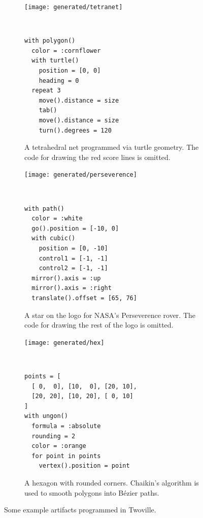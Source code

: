 \begin{figure}
\begin{subfigure}{0.3\linewidth}
\begin{minipage}{\linewidth}
\texttt{[image: generated/tetranet]}
\end{minipage}
\\
\begin{minipage}{\linewidth}
\small
\begin{verbatim}
with polygon()
  color = :cornflower
  with turtle()
    position = [0, 0]
    heading = 0
  repeat 3
    move().distance = size
    tab()
    move().distance = size
    turn().degrees = 120
\end{verbatim}
\end{minipage}
\caption{A tetrahedral net programmed via turtle geometry. The code for drawing the red score lines is omitted.}
\label{figure:tetranet}
\end{subfigure}%
\hfill
\begin{subfigure}{0.3\linewidth}
\begin{minipage}{\linewidth}
\texttt{[image: generated/perseverence]}
\vspace{0.5em}
\end{minipage}
\\
\begin{minipage}{\linewidth}
\small
\begin{verbatim}
with path()
  color = :white
  go().position = [-10, 0]
  with cubic()
    position = [0, -10]
    control1 = [-1, -1]
    control2 = [-1, -1]
  mirror().axis = :up
  mirror().axis = :right
  translate().offset = [65, 76]
\end{verbatim}
\end{minipage}
\caption{A star on the logo for NASA's Perseverence rover. The code for drawing the rest of the logo is omitted.}
\label{figure:perseverence}
\end{subfigure}%
\hfill
\begin{subfigure}{0.3\linewidth}
\begin{minipage}{\linewidth}
\texttt{[image: generated/hex]}
\vspace{0.5em}
\end{minipage}
\\
\begin{minipage}{\linewidth}
\small
\begin{verbatim}
points = [
  [ 0,  0], [10,  0], [20, 10],
  [20, 20], [10, 20], [ 0, 10]
]
with ungon()
  formula = :absolute
  rounding = 2
  color = :orange
  for point in points
    vertex().position = point
\end{verbatim}
\end{minipage}
\caption{A hexagon with rounded corners. Chaikin's algorithm is used to smooth polygons into Bézier paths.}
\label{figure:hex}
\end{subfigure}%
\caption{Some example artifacts programmed in Twoville.}
\label{figure:gallery}
\end{figure}

